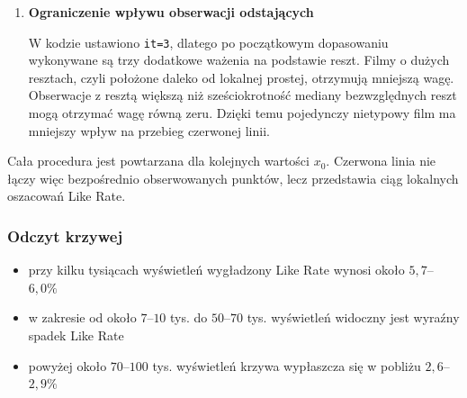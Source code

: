 \documentclass[12pt,a4paper]{article}
\begin{document}
\begin{enumerate}
    \[
    \overline{x}_{\omega}
    =
    \frac{\sum_i \omega_i x_i}{\sum_i \omega_i},
    \qquad
    \overline{y}_{\omega}
    =
    \frac{\sum_i \omega_i y_i}{\sum_i \omega_i}.
    \]

    Współczynnik nachylenia lokalnej prostej jest równy:

    \[
    b=
    \frac{
        \sum_i \omega_i
        (x_i-\overline{x}_{\omega})
        (y_i-\overline{y}_{\omega})
    }{
        \sum_i \omega_i
        (x_i-\overline{x}_{\omega})^2
    },
    \]

    natomiast wyraz wolny:

    \[
    a=\overline{y}_{\omega}-b\overline{x}_{\omega}.
    \]

    Wartość krzywej LOWESS w badanym miejscu wynosi więc:

    \[
    \widehat{y}(x_0)=a+bx_0.
    \]

    \item \textbf{Ograniczenie wpływu obserwacji odstających}

    W kodzie ustawiono \texttt{it=3}, dlatego po początkowym dopasowaniu wykonywane są trzy dodatkowe ważenia na podstawie reszt. Filmy o dużych resztach, czyli położone daleko od lokalnej prostej, otrzymują mniejszą wagę. Obserwacje z resztą większą niż sześciokrotność mediany bezwzględnych reszt mogą otrzymać wagę równą zeru. Dzięki temu pojedynczy nietypowy film ma mniejszy wpływ na przebieg czerwonej linii.
\end{enumerate}

Cała procedura jest powtarzana dla kolejnych wartości $x_0$. Czerwona linia nie łączy więc bezpośrednio obserwowanych punktów, lecz przedstawia ciąg lokalnych oszacowań Like Rate.

\subsubsection*{Odczyt krzywej}

\begin{itemize}
    \item przy kilku tysiącach wyświetleń wygładzony Like Rate wynosi około $5{,}7$--$6{,}0\%$
    \item w zakresie od około $7$--$10$ tys. do $50$--$70$ tys. wyświetleń widoczny jest wyraźny spadek Like Rate
    \item powyżej około $70$--$100$ tys. wyświetleń krzywa wypłaszcza się w pobliżu $2{,}6$--$2{,}9\%$
\end{itemize}
\end{document}
